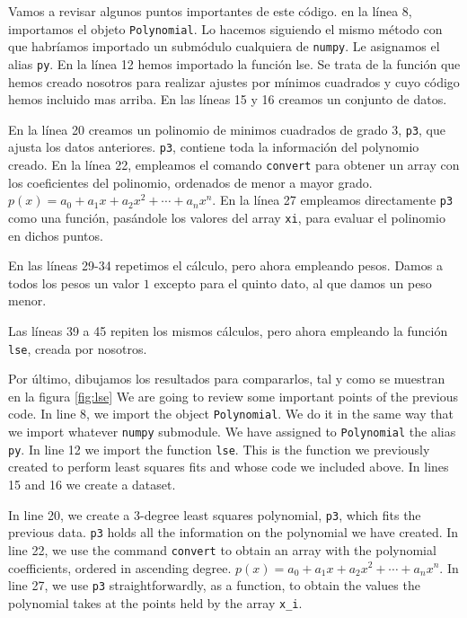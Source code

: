 \begin{paracol}{2}
Vamos a revisar algunos puntos importantes de este código. en la línea 8, importamos el objeto \texttt{Polynomial}. Lo hacemos siguiendo el mismo método con que habríamos importado un submódulo cualquiera de \texttt{numpy}. Le asignamos el alias \texttt{py}.
En la línea 12 hemos importado la función lse. Se trata de la función que hemos creado nosotros para realizar ajustes por mínimos cuadrados y cuyo código hemos incluido mas arriba. En las líneas 15 y 16 creamos un conjunto de datos.

En la línea 20 creamos un polinomio de minimos cuadrados de grado 3, \texttt{p3}, que ajusta los datos anteriores. \texttt{p3}, contiene toda la información del polynomio creado. En la línea 22, empleamos el comando \texttt{convert} para obtener un array con los coeficientes del polinomio, ordenados de menor a mayor grado. $p(x)=a_0 + a_1x +a_2x^2+\cdots+a_nx^n$. En la línea 27 empleamos directamente \texttt{p3} como una función, pasándole los valores del array \texttt{xi}, para evaluar el polinomio en dichos puntos.

En las líneas 29-34 repetimos el cálculo, pero ahora empleando pesos. Damos a todos los pesos un valor $1$ excepto para el quinto dato, al que damos un peso menor.

Las líneas 39 a 45 repiten los mismos cálculos, pero ahora empleando la función \texttt{lse}, creada por nosotros.

Por último, dibujamos los resultados para compararlos, tal y como se muestran en la figura \ref{fig:lse}
\switchcolumn
We are going to review some important points of the previous code. In line 8, we import the object \texttt{Polynomial}. We do it in the same way that we import whatever \texttt{numpy} submodule. We have assigned to \texttt{Polynomial} the alias \texttt{py}. In line 12 we import the function \texttt{lse}. This is the function we previously created to perform least squares fits and whose code we included above. In lines 15 and 16 we create a dataset.

In line 20, we create a 3-degree least squares polynomial, \texttt{p3}, which fits the previous data. \texttt{p3} holds all the information on the polynomial we have created. In line 22, we use the command \texttt{convert} to obtain an array with the polynomial coefficients, ordered in ascending degree. $p(x)=a_0 + a_1x +a_2x^2+\cdots+a_nx^n$. In line 27, we use \texttt{p3} straightforwardly, as a function, to obtain the values the polynomial takes at the points held by the array \texttt{x_i}.


\end{paracol}

